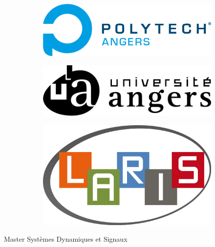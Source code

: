 \documentclass[12pt,a4paper]{report}
\begin{document}
\begin{titlepage}
    \begin{center}
      \begin{figure}[!tbp]
        \centering
        \begin{subfigure}[b]{0.3\textwidth}
          \includegraphics[width=\textwidth]{Polytech_Angers.png}
        \end{subfigure}
        \hfill
        \begin{subfigure}[b]{0.3\textwidth}
          \includegraphics[width=\textwidth]{LogoUnivAngers.png}
        \end{subfigure}
        \hfill
        \begin{subfigure}[b]{0.2\textwidth}
          \includegraphics[width=\textwidth]{LogoLARIS.png}
        \end{subfigure}
      \end{figure}
      {\large Master Systèmes Dynamiques et Signaux}\\[0.5cm]

\end{center}
\end{titlepage}
\end{document}
